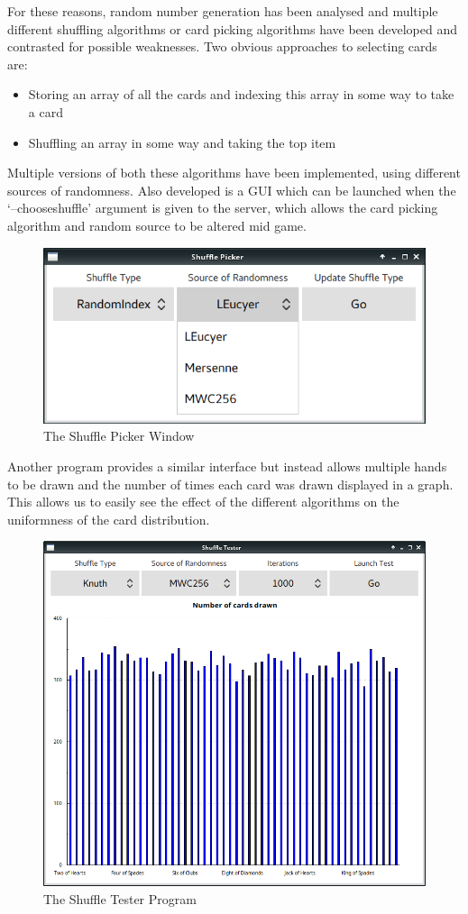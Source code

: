 For these reasons, random number generation has been analysed and multiple
different shuffling algorithms or card picking algorithms have been
developed and contrasted for possible weaknesses. Two obvious approaches to 
selecting cards are:

\begin{itemize}
    \item Storing an array of all the cards and indexing this array in some way to take a card
    \item Shuffling an array in some way and taking the top item
\end{itemize}

\newpage

Multiple versions of both these algorithms have been implemented, using
different sources of randomness. Also developed is a GUI which can be launched
when the `--chooseshuffle' argument is given to the server, which allows
the card picking algorithm and random source to be altered mid game. 

\begin{figure}[H]
    \centering
    \includegraphics[width=0.8\linewidth]{../images/shufflepicker.png}
    \caption{The Shuffle Picker Window}%
    \label{fig:shufflepicker}
\end{figure}

Another program provides a similar interface but instead allows multiple hands 
to be drawn and the number of times each card was drawn displayed in a graph. 
This  allows us to easily see the effect of the different algorithms on the 
uniformness of the card distribution.

\begin{figure}[H]
    \centering
    \includegraphics[width=0.8\linewidth]{../images/shuffletester.png}
    \caption{The Shuffle Tester Program}%
    \label{fig:shuffletester}
\end{figure}

